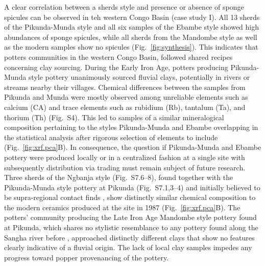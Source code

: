 \documentclass[preprint,10pt,oneside,onecolumn,authoryear]{elsarticle}
\begin{document}
A clear correlation between a sherds style and presence or absence of sponge spicules can be observed in teh western Congo Basin (case study I). All 13 sherds of the Pikunda-Munda style and all six samples of the Ebambe style showed high abundances of sponge spicules, while all sherds from the Mandombe style as well as the modern samples show no spicules (Fig.~\ref{fig:synthesis}). This indicates that potters communities in the western Congo Basin, followed shared recipes concerning clay sourcing. During the Early Iron Age, potters producing Pikunda-Munda style pottery unanimously sourced fluvial clays, potentially in rivers or streams nearby their villages. Chemical differences between the samples from Pikunda and Munda were mostly observed among unreliable elements such as calcium (CA) and trace elements such as rubidium (Rb), tantalum (Ta), and thorium (Th) (Fig.~S4). This led to samples of a similar mineralogical composition pertaining to the styles Pikunda-Munda and Ebambe overlapping in the statistical analysis after rigorous selection of elements to include (Fig.~\ref{fig:xrf.pca}B). In consequence, the question if Pikunda-Munda and Ebambe pottery were produced locally or in a centralized fashion at a single site with subsequently distribution via trading must remain subject of future research. Three sherds of the Ngbanja style (Fig.~S7.6--8), found together with the Pikunda-Munda style pottery at Pikunda (Fig.~S7.1,3--4) and initially believed to be supra-regional contact finds \citep[296--297]{Seidensticker.2021e}, show distinctly similar chemical composition to the modern ceramics produced at the site in 1987 (Fig.~\ref{fig:xrf.pca}B). The potters' community producing the Late Iron Age Mandombe style pottery found at Pikunda, which shares no stylistic resemblance to any pottery found along the Sangha river before \citep{Seidensticker.2025}, approached distinctly different clays that show no features clearly indicative of a fluvial origin. The lack of local clay samples impedes any progress toward popper provenancing of the pottery.
\end{document}
